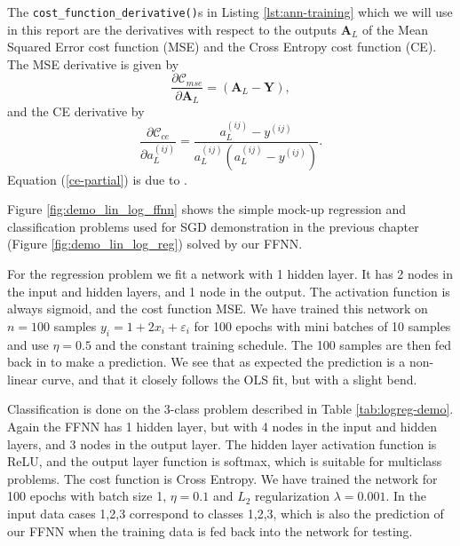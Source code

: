 \documentclass[]{article}
\begin{document}

The \lstinline|cost_function_derivative()|s in Listing \ref{lst:ann-training} which we will use in this report are the derivatives with respect to the outputs $\mathbf{A}_L$ of the Mean Squared Error cost function (MSE) and the Cross Entropy cost function (CE). The MSE derivative is given by
\begin{equation}
	\frac{\partial \mathcal{C}_{mse}}{\partial \mathbf{A}_L} = (\mathbf{A}_L - \mathbf{Y}),
\end{equation}
and the CE derivative by
\begin{equation} \label{ce-partial}
	\frac{\partial \mathcal{C}_{ce}}{\partial a_L^{(ij)}} = \frac{a_L^{(ij)} - y^{(ij)}}{a_L^{(ij)} (a_L^{(ij)} - y^{(ij)})}.
\end{equation}
Equation (\ref{ce-partial}) is due to \cite{fys-stk4155-notes}.

\vspace{5mm}

Figure \ref{fig:demo_lin_log_ffnn} shows the simple mock-up regression and classification problems used for SGD demonstration in the previous chapter (Figure \ref{fig:demo_lin_log_reg}) solved by our FFNN.

For the regression problem we fit a network with 1 hidden layer. It has 2 nodes in the input and hidden layers, and 1 node in the output. The activation function is always sigmoid, and the cost function MSE. We have trained this network on $n = 100$ samples $y_i = 1 + 2x_i + \varepsilon_i$ for 100 epochs with mini batches of 10 samples and use $\eta = 0.5$ and the constant training schedule. The 100 samples are then fed back in to make a prediction. We see that as expected the prediction is a non-linear curve, and that it closely follows the OLS fit, but with a slight bend.

Classification is done on the 3-class problem described in Table \ref{tab:logreg-demo}. Again the FFNN has 1 hidden layer, but with 4 nodes in the input and hidden layers, and 3 nodes in the output layer. The hidden layer activation function is ReLU, and the output layer function is softmax, which is suitable for multiclass problems. The cost function is Cross Entropy. We have trained the network for 100 epochs with batch size 1, $\eta = 0.1$ and $L_2$ regularization $\lambda = 0.001$. In the input data cases 1,2,3 correspond to classes 1,2,3, which is also the prediction of our FFNN when the training data is fed back into the network for testing.
\end{document}
